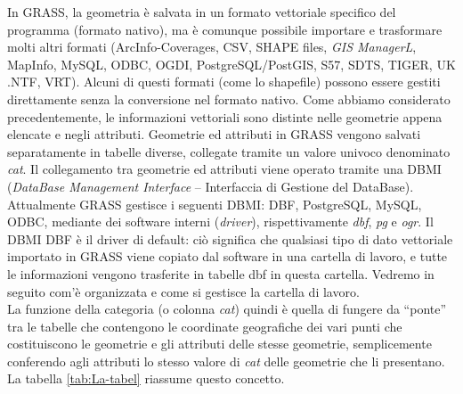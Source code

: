 		In GRASS, la geometria è salvata in un formato vettoriale specifico del programma (formato nativo), ma è comunque possibile importare e trasformare molti altri formati (ArcInfo-Coverages, CSV, SHAPE files, \emph{GIS ManagerL}, MapInfo, MySQL, ODBC, OGDI, PostgreSQL/PostGIS, S57, SDTS, TIGER, UK .NTF, VRT). Alcuni di questi formati (come lo shapefile) possono essere gestiti direttamente senza la conversione nel formato nativo. Come abbiamo considerato precedentemente, le informazioni vettoriali sono distinte nelle geometrie appena elencate e negli attributi. Geometrie ed attributi in GRASS vengono salvati separatamente in tabelle diverse, collegate tramite un valore univoco denominato \emph{cat}. Il collegamento tra geometrie ed attributi viene operato tramite una DBMI (\emph{DataBase Management Interface} -- Interfaccia di Gestione del DataBase). Attualmente GRASS gestisce i seguenti DBMI: DBF, PostgreSQL, MySQL, ODBC, mediante dei software interni (\emph{driver}), rispettivamente \emph{dbf}, \emph{pg} e \emph{ogr}. Il DBMI DBF è il driver di default: ciò significa che qualsiasi tipo di dato vettoriale importato in GRASS viene copiato dal software in una cartella di lavoro, e tutte le informazioni vengono trasferite in tabelle dbf in questa cartella. Vedremo in seguito com'è organizzata e come si gestisce la cartella di lavoro.\\

		La funzione della categoria (o colonna \emph{cat}) quindi è quella di fungere da {}``ponte'' tra le tabelle che contengono le coordinate geografiche dei vari punti che costituiscono le geometrie e gli attributi delle stesse geometrie, semplicemente conferendo agli attributi lo stesso valore di \emph{cat} delle geometrie che li presentano. La tabella \ref{tab:La-tabel} riassume questo concetto.

		\begin{table}
			\centering
			
			\qquad
			
			\caption{\label{tab:La-tabel}{\small La tabella di sinistra sintetizza la struttura della tabella delle geometrie, contenente le coordinate dei punti e la loro topologia; la tabella a destra mostra come la colonna}\emph{\small cat}{\small{} determini il collegamento degli attributi (immagazzinati in un'apposita tabella) con le geometrie.}}
		\end{table}

		

